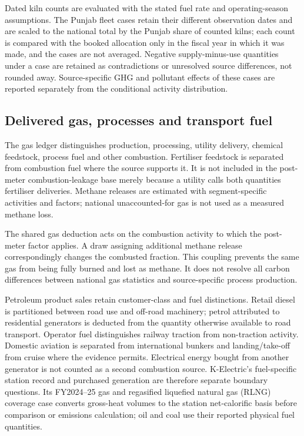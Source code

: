 \documentclass[essd]{copernicus}
\begin{document}
Dated kiln counts are evaluated with the stated fuel rate and operating-season assumptions. The Punjab fleet cases retain their different observation dates and are scaled to the national total by the Punjab share of counted kilns; each count is compared with the booked allocation only in the fiscal year in which it was made, and the cases are not averaged. Negative supply-minus-use quantities under a case are retained as contradictions or unresolved source differences, not rounded away. Source-specific GHG and pollutant effects of these cases are reported separately from the conditional activity distribution.

\subsection{Delivered gas, processes and transport fuel}
The gas ledger distinguishes production, processing, utility delivery, chemical feedstock, process fuel and other combustion. Fertiliser feedstock is separated from combustion fuel where the source supports it. It is not included in the post-meter combustion-leakage base merely because a utility calls both quantities fertiliser deliveries. Methane releases are estimated with segment-specific activities and factors; national unaccounted-for gas is not used as a measured methane loss.

The shared gas deduction acts on the combustion activity to which the post-meter factor applies. A draw assigning additional methane release correspondingly changes the combusted fraction. This coupling prevents the same gas from being fully burned and lost as methane. It does not resolve all carbon differences between national gas statistics and source-specific process production.

Petroleum product sales retain customer-class and fuel distinctions. Retail diesel is partitioned between road use and off-road machinery; petrol attributed to residential generators is deducted from the quantity otherwise available to road transport. Operator fuel distinguishes railway traction from non-traction activity. Domestic aviation is separated from international bunkers and landing/take-off from cruise where the evidence permits. Electrical energy bought from another generator is not counted as a second combustion source. K-Electric's fuel-specific station record and purchased generation are therefore separate boundary questions. Its FY2024--25 gas and regasified liquefied natural gas (RLNG) coverage case converts gross-heat volumes to the station net-calorific basis before comparison or emissions calculation; oil and coal use their reported physical fuel quantities.
\end{document}
